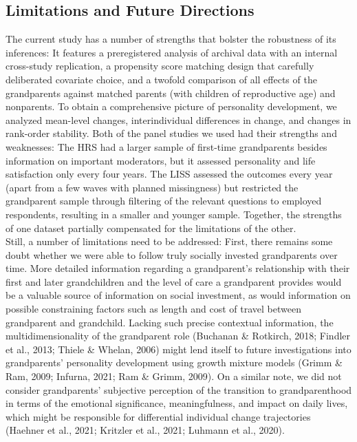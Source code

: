 \documentclass[
  english,
  man,floatsintext]{apa7}
\begin{document}
\hypertarget{limitations-and-future-directions}{%
\subsection{Limitations and Future Directions}\label{limitations-and-future-directions}}

The current study has a number of strengths that bolster the robustness of its inferences: It features a preregistered analysis of archival data with an internal cross-study replication, a propensity score matching design that carefully deliberated covariate choice, and a twofold comparison of all effects of the grandparents against matched parents (with children of reproductive age) and nonparents. To obtain a comprehensive picture of personality development, we analyzed mean-level changes, interindividual differences in change, and changes in rank-order stability. Both of the panel studies we used had their strengths and weaknesses: The HRS had a larger sample of first-time grandparents besides information on important moderators, but it assessed personality and life satisfaction only every four years. The LISS assessed the outcomes every year (apart from a few waves with planned missingness) but restricted the grandparent sample through filtering of the relevant questions to employed respondents, resulting in a smaller and younger sample. Together, the strengths of one dataset partially compensated for the limitations of the other.\\
Still, a number of limitations need to be addressed: First, there remains some doubt whether we were able to follow truly socially invested grandparents over time. More detailed information regarding a grandparent's relationship with their first and later grandchildren and the level of care a grandparent provides would be a valuable source of information on social investment, as would information on possible constraining factors such as length and cost of travel between grandparent and grandchild. Lacking such precise contextual information, the multidimensionality of the grandparent role (Buchanan \& Rotkirch, 2018; Findler et al., 2013; Thiele \& Whelan, 2006) might lend itself to future investigations into grandparents' personality development using growth mixture models (Grimm \& Ram, 2009; Infurna, 2021; Ram \& Grimm, 2009). On a similar note, we did not consider grandparents' subjective perception of the transition to grandparenthood in terms of the emotional significance, meaningfulness, and impact on daily lives, which might be responsible for differential individual change trajectories (Haehner et al., 2021; Kritzler et al., 2021; Luhmann et al., 2020).\\
\end{document}
